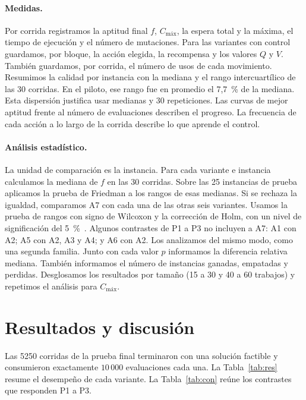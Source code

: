 \documentclass[10pt,a4paper]{article}
\newcommand{\Cmax}{C_{\text{máx}}}
\begin{document}
\paragraph{Medidas.}
Por corrida registramos la aptitud final $f$, $\Cmax$, la espera total y la máxima, el tiempo de
ejecución y el número de mutaciones. Para las variantes con control guardamos, por bloque, la
acción elegida, la recompensa y los valores $Q$ y $V$. También guardamos, por corrida, el número
de usos de cada movimiento. Resumimos la calidad por instancia con la mediana y el rango
intercuartílico de las 30 corridas. En el piloto, ese rango fue en promedio el 7,7~\% de la
mediana. Esta dispersión justifica usar medianas y 30 repeticiones. Las curvas de mejor aptitud
frente al número de evaluaciones describen el progreso. La frecuencia de cada acción a lo largo
de la corrida describe lo que aprende el control.

\paragraph{Análisis estadístico.}
La unidad de comparación es la instancia. Para cada variante e instancia calculamos la mediana
de $f$ en las 30 corridas. Sobre las 25 instancias de prueba aplicamos la prueba de Friedman a
los rangos de esas medianas. Si se rechaza la igualdad, comparamos A7 con cada una de las otras
seis variantes. Usamos la prueba de rangos con signo de Wilcoxon y la corrección de Holm, con
un nivel de significación del 5~\%~\cite{derrac2011}. Algunos contrastes de P1 a P3 no incluyen
a A7: A1 con A2; A5 con A2, A3 y A4; y A6 con A2. Los analizamos del mismo modo, como una
segunda familia. Junto con cada valor $p$ informamos la diferencia relativa mediana. También
informamos el número de instancias ganadas, empatadas y perdidas. Desglosamos los resultados
por tamaño (15 a 30 y 40 a 60 trabajos) y repetimos el análisis para $\Cmax$.

\section{Resultados y discusión}
\label{sec:res}

Las 5250 corridas de la prueba final terminaron con una solución factible y consumieron
exactamente $10\,000$ evaluaciones cada una. La Tabla~\ref{tab:res} resume el desempeño de cada
variante. La Tabla~\ref{tab:con} reúne los contrastes que responden P1 a P3.
\end{document}
